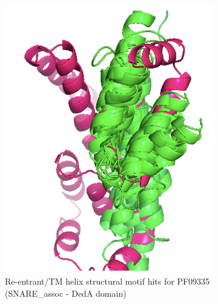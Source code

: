 \begin{figure}[htb]
    \centering %
\begin{subfigure}{0.3\textwidth}
  \includegraphics[width=\linewidth]{Pfam/PF09335.png}
  \caption{Re-entrant/TM helix structural motif hits for PF09335 (SNARE\_assoc - DedA domain)}
  \label{fig:tmem}
\end{subfigure}\hfil %
\begin{subfigure}{0.3\textwidth}

\end{subfigure}
\end{figure}
